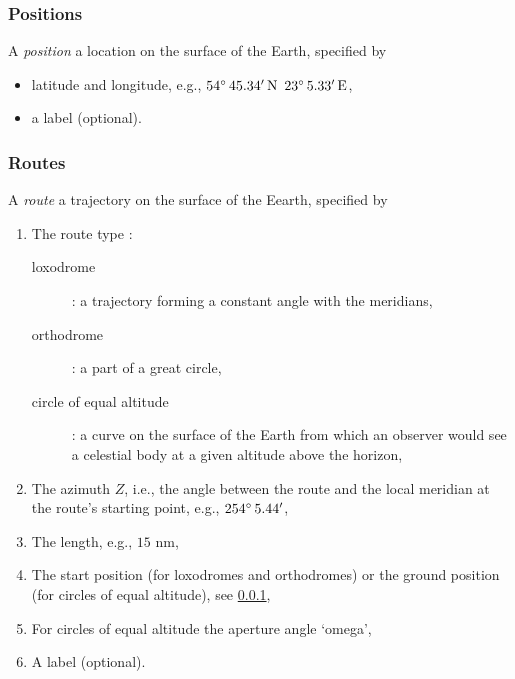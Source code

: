 \documentclass{ol-softwaremanual}
\begin{document}
\subsubsection{Positions}  \label{section-positions} 

A \textit{position} a  location on the surface of the Earth, specified by 
\begin{itemize}
\item latitude and longitude, e.g., $54 \degree \, 45.34'\, \textrm{N}$ $23 \degree \, 5.33'\, \textrm{E}$,
\item a label (optional).
\end{itemize}
\subsubsection{Routes} \label{section-routes} 

A \textit{route} a trajectory on the surface of the Eearth, specified by 
\begin{enumerate}
  \item \label{item-route-type} The route type \cite{bowditch2002the}: 
  \begin{description}
  \item [loxodrome]: a trajectory forming a constant angle with the meridians,
  \item [orthodrome]: a part of a great circle,
  \item [circle of equal altitude]: a curve on the surface of the Earth from which an observer would see a celestial body at a given altitude above the horizon,
  \end{description}
  \item \label{item-route-azimuth} The azimuth $Z$, i.e., the angle between the route  and the local meridian at the route's starting point, e.g., $254 \degree \, 5.44'$,
  \item \label{item-route-length} The length, e.g., $15$ \ac{nm},
  \item \label{item-route-reference-position} The start position (for loxodromes and orthodromes) or the ground position (for circles of equal altitude), see \cref{section-positions},
  \item \label{item-route-aperture} For circles of equal altitude the aperture angle `omega',
  \item \label{item-route-label} A label (optional). 
\end{enumerate}
\end{document}
